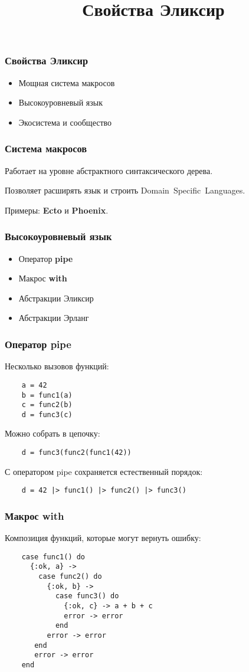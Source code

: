 \documentclass[10pt]{beamer}
\title{Свойства Эликсир}
\begin{document}
\begin{frame}
  \frametitle{Свойства Эликсир}
  \begin{itemize}
  \item Мощная система макросов
  \item Высокоуровневый язык
  \item Экосистема и сообщество
  \end{itemize}
\end{frame}

\begin{frame}
  \frametitle{Система макросов}
  Работает на уровне абстрактного синтаксического дерева.
  \par \bigskip
  Позволяет расширять язык и строить Domain~Specific~Languages.
  \par \bigskip
  Примеры: \textbf{Ecto} и \textbf{Phoenix}.
\end{frame}

\begin{frame}
  \frametitle{Высокоуровневый язык}
  \begin{itemize}
  \item Оператор \textbf{pipe}
  \item Макрос \textbf{with}
  \item Абстракции Эликсир
  \item Абстракции Эрланг
  \end{itemize}  
\end{frame}


\begin{frame}[fragile]
  \frametitle{Оператор pipe}
  Несколько вызовов функций:
  \begin{lstlisting}
    a = 42
    b = func1(a)
    c = func2(b)
    d = func3(c)
  \end{lstlisting}
  Можно собрать в цепочку:
  \begin{lstlisting}
    d = func3(func2(func1(42))
  \end{lstlisting}
  С оператором pipe сохраняется естественный порядок:
  \begin{lstlisting}
    d = 42 |> func1() |> func2() |> func3()
  \end{lstlisting}
\end{frame}

\begin{frame}[fragile]
  \frametitle{Макрос with}
  Композиция функций, которые могут вернуть ошибку:
  \begin{lstlisting}
    case func1() do
      {:ok, a} -> 
        case func2() do
          {:ok, b} -> 
            case func3() do
              {:ok, c} -> a + b + c
              error -> error
            end
          error -> error
       end
       error -> error
    end
  \end{lstlisting}
\end{frame}
\end{document}
